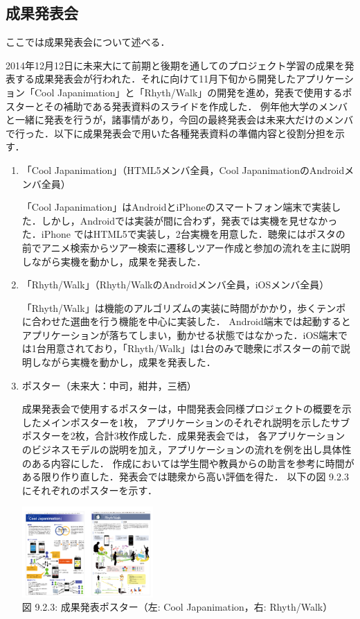 \subsection{成果発表会}
\par
ここでは成果発表会について述べる．
\par
 2014年12月12日に未来大にて前期と後期を通してのプロジェクト学習の成果を発表する成果発表会が行われた．それに向けて11月下旬から開発したアプリケーション「Cool Japanimation」と「Rhyth/Walk」の開発を進め，発表で使用するポスターとその補助である発表資料のスライドを作成した．
例年他大学のメンバと一緒に発表を行うが，諸事情があり，今回の最終発表会は未来大だけのメンバで行った．以下に成果発表会で用いた各種発表資料の準備内容と役割分担を示す．
\begin{enumerate}
\item 「Cool Japanimation」（HTML5メンバ全員，Cool JapanimationのAndroidメンバ全員）
\par
 「Cool Japanimation」はAndroidとiPhoneのスマートフォン端末で実装した．しかし，Androidでは実装が間に合わず，発表では実機を見せなかった．iPhone ではHTML5で実装し，2台実機を用意した．聴衆にはポスタの前でアニメ検索からツアー検索に遷移しツアー作成と参加の流れを主に説明しながら実機を動かし，成果を発表した．
\par
\item 「Rhyth/Walk」（Rhyth/WalkのAndroidメンバ全員，iOSメンバ全員）
\par
 「Rhyth/Walk」は機能のアルゴリズムの実装に時間がかかり，歩くテンポに合わせた選曲を行う機能を中心に実装した． Android端末では起動するとアプリケーションが落ちてしまい，動かせる状態ではなかった．iOS端末では1台用意されており，「Rhyth/Walk」は1台のみで聴衆にポスターの前で説明しながら実機を動かし，成果を発表した．


\item ポスター（未来大：中司，紺井，三栖）
\par
 成果発表会で使用するポスターは，中間発表会同様プロジェクトの概要を示したメインポスターを1枚，
 アプリケーションのそれぞれ説明を示したサブポスターを2枚，合計3枚作成した．成果発表会では，
 各アプリケーションのビジネスモデルの説明を加え，アプリケーションの流れを例を出し具体性のある内容にした．
 作成においては学生間や教員からの助言を参考に時間がある限り作り直した．発表会では聴衆から高い評価を得た．
 以下の図 9.2.3にそれぞれのポスターを示す．
\begin{center}
\includegraphics[width=5cm, bb=0 0 200 150]{poster.png} \\
  図 9.2.3: 成果発表ポスター（左: Cool Japanimation，右: Rhyth/Walk）
\end{center}


\end{enumerate}
